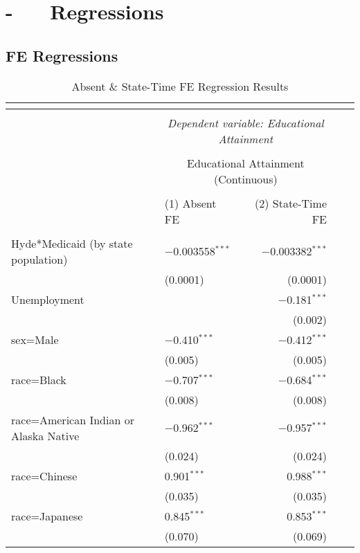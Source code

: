 \section{ - ~~ Regressions}
\subsection{FE Regressions}
    \begingroup\tiny
    \begin{longtable}{ll|rrr}
    \caption{Absent \& State-Time FE Regression Results} \\
    \label{app_noFE.s/t_reg} 
    \\ [-4ex]\hline 
    \hline \\[-4ex] 
    & \multicolumn{2}{c}{\textit{Dependent variable: Educational Attainment}} \\ 
    \cline{2-3} 
    \\[-4ex] & \multicolumn{2}{c}{Educational Attainment (Continuous)} \\ 
    \\[-4ex] & (1) Absent FE & (2) State-Time FE\\ 
    \hline \\[-4ex] 
        Hyde*Medicaid (by state population) & $-$0.003558$^{***}$ & $-$0.003382$^{***}$ \\ 
        & (0.0001) & (0.0001) \\ 
        Unemployment &  & $-$0.181$^{***}$ \\ 
        &  & (0.002) \\ 
        sex=Male & $-$0.410$^{***}$ & $-$0.412$^{***}$ \\ 
        & (0.005) & (0.005) \\ 
        race=Black & $-$0.707$^{***}$ & $-$0.684$^{***}$ \\ 
        & (0.008) & (0.008) \\ 
        race=American Indian or Alaska Native & $-$0.962$^{***}$ & $-$0.957$^{***}$ \\ 
        & (0.024) & (0.024) \\ 
        race=Chinese & 0.901$^{***}$ & 0.988$^{***}$ \\ 
        & (0.035) & (0.035) \\ 
        race=Japanese & 0.845$^{***}$ & 0.853$^{***}$ \\ 
        & (0.070) & (0.069) \\ 

\end{longtable}
